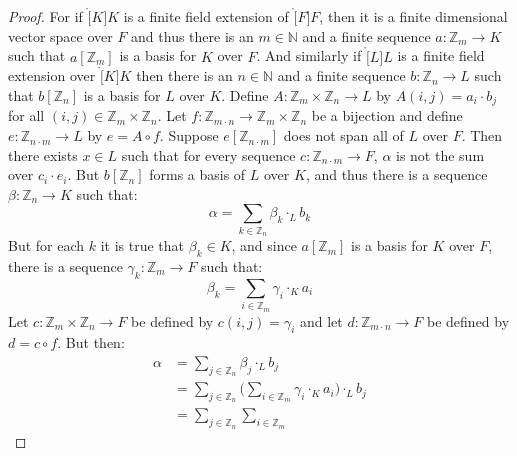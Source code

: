     \begin{proof}
        For if $\ring[K]{K}$ is a finite field extension of $\ring[F]{F}$,
        then it is a finite dimensional vector space over $F$ and thus there
        is an $m\in\mathbb{N}$ and a finite sequence
        $a:\mathbb{Z}_{m}\rightarrow{K}$ such that $a[\mathbb{Z}_{m}]$ is a
        basis for $K$ over $F$. And similarly if $\ring[L]{L}$ is a finite
        field extension over $\ring[K]{K}$ then there is an $n\in\mathbb{N}$
        and a finite sequence $b:\mathbb{Z}_{n}\rightarrow{L}$ such that
        $b[\mathbb{Z}_{n}]$ is a basis for $L$ over $K$. Define
        $A:\mathbb{Z}_{m}\times\mathbb{Z}_{n}\rightarrow{L}$ by
        $A(i,j)=a_{i}\cdot{b}_{j}$ for all
        $(i,j)\in\mathbb{Z}_{m}\times\mathbb{Z}_{n}$. Let
        $f:\mathbb{Z}_{m\cdot{n}}\rightarrow%
         \mathbb{Z}_{m}\times\mathbb{Z}_{n}$ be a bijection and define
        $e:\mathbb{Z}_{n\cdot{m}}\rightarrow{L}$ by $e=A\circ{f}$. Suppose
        $e[\mathbb{Z}_{n\cdot{m}}]$ does not span all of $L$ over $F$. Then
        there exists $x\in{L}$ such that for every sequence
        $c:\mathbb{Z}_{n\cdot{m}}\rightarrow{F}$, $\alpha$ is not the
        sum over $c_{i}\cdot{e}_{i}$. But $b[\mathbb{Z}_{n}]$ forms a basis
        of $L$ over $K$, and thus there is a sequence
        $\beta:\mathbb{Z}_{n}\rightarrow{K}$ such that:
        \begin{equation}
            \alpha=\sum_{k\in\mathbb{Z}_{n}}\beta_{k}\cdot_{L}{b}_{k}
        \end{equation}
        But for each $k$ it is true that $\beta_{k}\in{K}$, and since
        $a[\mathbb{Z}_{m}]$ is a basis for $K$ over $F$, there is a sequence
        $\gamma_{k}:\mathbb{Z}_{m}\rightarrow{F}$ such that:
        \begin{equation}
            \beta_{k}=\sum_{i\in\mathbb{Z}_{m}}\gamma_{i}\cdot_{K}a_{i}
        \end{equation}
        Let $c:\mathbb{Z}_{m}\times\mathbb{Z}_{n}\rightarrow{F}$ be defined
        by $c(i,j)=\gamma_{i}$ and let
        $d:\mathbb{Z}_{m\cdot{n}}\rightarrow{F}$ be defined by
        $d=c\circ{f}$. But then:
        \begin{align}
            \alpha&=\sum_{j\in\mathbb{Z}_{n}}\beta_{j}\cdot_{L}b_{j}\\
            &=\sum_{j\in\mathbb{Z}_{n}}\Big(
                \sum_{i\in\mathbb{Z}_{m}}\gamma_{i}\cdot_{K}a_{i}\Big)
                \cdot_{L}b_{j}\\
            &=\sum_{j\in\mathbb{Z}_{n}}\sum_{i\in\mathbb{Z}_{m}}

\end{align}
\end{proof}
